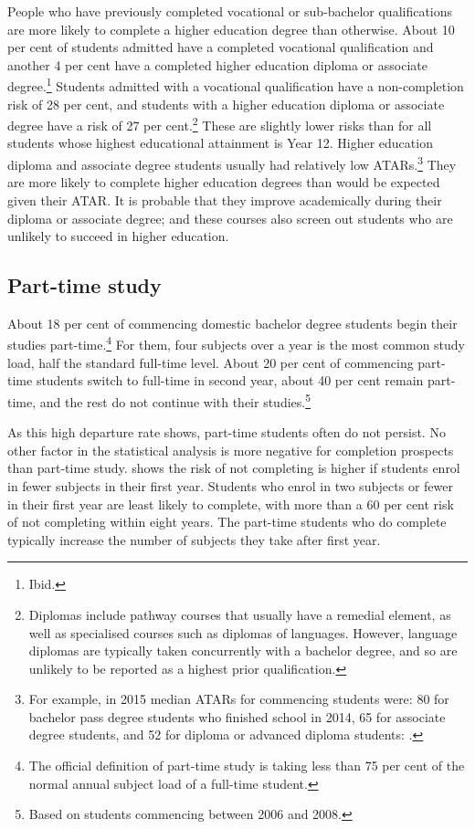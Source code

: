 People who have previously completed vocational or sub-bachelor qualifications are more likely to complete a higher education degree than otherwise. About 10 per cent of students admitted have a completed vocational qualification and another 4 per cent have a completed higher education diploma or associate degree.\footnote{Ibid.} 
Students admitted with a vocational qualification have a non-completion risk of 28 per cent, and students with a higher education diploma or associate degree have a risk of 27 per cent.\footnote{Diplomas include pathway courses that usually have a remedial element, as well as specialised courses such as diplomas of languages. However, language diplomas are typically taken concurrently with a bachelor degree, and so are unlikely to be reported as a highest prior qualification.} 
These are slightly lower risks than for all students whose highest educational attainment is Year 12. Higher education diploma and associate degree students usually had relatively low ATARs.\footnote{For example, in 2015 median ATARs for commencing students were: 80 for bachelor pass degree students who finished school in 2014, 65 for associate degree students, and 52 for diploma or advanced diploma students: \textcite{DepartmentofEducationandTraining2017n}.} They are more likely to complete higher education degrees than would be expected given their ATAR\@. It is probable that they improve academically during their diploma or associate degree; and these courses also screen out students who are unlikely to succeed in higher education.

\subsection{Part-time study}\label{subsec:3.1.2}

About 18 per cent of commencing domestic bachelor degree students begin their studies part-time.\footnote{The official definition of part-time study is taking less than 75 per cent of the normal annual subject load of a full-time student.} 
For them, four subjects over a year is the most common study load, half the standard full-time level. About 20 per cent of commencing part-time students switch to full-time in second year, about 40 per cent remain part-time, and the rest do not continue with their studies.\footnote{Based on students commencing between 2006 and 2008.}

As this high departure rate shows, part-time students often do not persist. No other factor in the statistical analysis is more negative for completion prospects than part-time study.  shows the risk of not completing is higher if students enrol in fewer subjects in their first year. Students who enrol in two subjects or fewer in their first year are least likely to complete, with more than a 60 per cent risk of not completing within eight years. The part-time students who do complete typically increase the number of subjects they take after first year.

